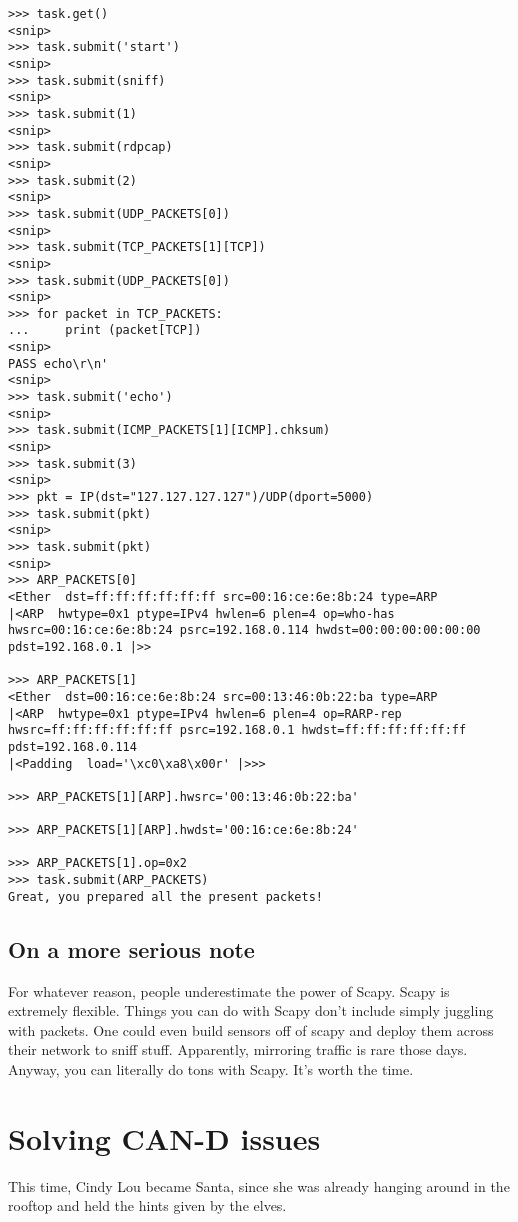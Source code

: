 \begin{verbatim}
>>> task.get()
<snip>
>>> task.submit('start')
<snip>
>>> task.submit(sniff)
<snip>
>>> task.submit(1)
<snip>
>>> task.submit(rdpcap)
<snip>
>>> task.submit(2)
<snip>
>>> task.submit(UDP_PACKETS[0])
<snip>
>>> task.submit(TCP_PACKETS[1][TCP])
<snip>
>>> task.submit(UDP_PACKETS[0])
<snip>
>>> for packet in TCP_PACKETS:
...     print (packet[TCP])
<snip>
PASS echo\r\n'
<snip>
>>> task.submit('echo')
<snip>
>>> task.submit(ICMP_PACKETS[1][ICMP].chksum)
<snip>
>>> task.submit(3)
<snip>
>>> pkt = IP(dst="127.127.127.127")/UDP(dport=5000)
>>> task.submit(pkt)
<snip>
>>> task.submit(pkt)
<snip>
>>> ARP_PACKETS[0]
<Ether  dst=ff:ff:ff:ff:ff:ff src=00:16:ce:6e:8b:24 type=ARP
|<ARP  hwtype=0x1 ptype=IPv4 hwlen=6 plen=4 op=who-has
hwsrc=00:16:ce:6e:8b:24 psrc=192.168.0.114 hwdst=00:00:00:00:00:00 pdst=192.168.0.1 |>>

>>> ARP_PACKETS[1]
<Ether  dst=00:16:ce:6e:8b:24 src=00:13:46:0b:22:ba type=ARP
|<ARP  hwtype=0x1 ptype=IPv4 hwlen=6 plen=4 op=RARP-rep
hwsrc=ff:ff:ff:ff:ff:ff psrc=192.168.0.1 hwdst=ff:ff:ff:ff:ff:ff pdst=192.168.0.114
|<Padding  load='\xc0\xa8\x00r' |>>>

>>> ARP_PACKETS[1][ARP].hwsrc='00:13:46:0b:22:ba'

>>> ARP_PACKETS[1][ARP].hwdst='00:16:ce:6e:8b:24'

>>> ARP_PACKETS[1].op=0x2
>>> task.submit(ARP_PACKETS)
Great, you prepared all the present packets!

\end{verbatim}

\subsection{On a more serious note}
For whatever reason, people underestimate the power of Scapy. Scapy is extremely flexible. Things you can do with Scapy don't include simply juggling with packets. One could even build sensors off of scapy and deploy them across their network to sniff stuff.
Apparently, mirroring traffic is rare those days. Anyway, you can literally do tons with Scapy. It's worth the time.

\section {Solving CAN-D issues}
This time, Cindy Lou became Santa, since she was already hanging around in the rooftop and held the hints given by the elves.

